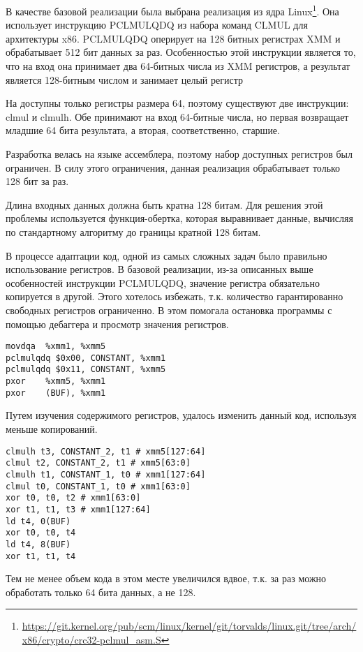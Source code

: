 
В качестве базовой реализации была выбрана реализация из ядра Linux\footnote{\url{https://git.kernel.org/pub/scm/linux/kernel/git/torvalds/linux.git/tree/arch/x86/crypto/crc32-pclmul_asm.S}}.
Она использует инструкцию PCLMULQDQ из набора команд CLMUL для архитектуры x86.
PCLMULQDQ оперирует на 128 битных регистрах XMM и обрабатывает 512 бит данных за раз.
Особенностью этой инструкции является то, что на вход она принимает два 64-битных числа из XMM регистров, а результат является 128-битным числом и занимает целый регистр

На \riscv{} доступны только регистры размера 64, поэтому существуют две инструкции: clmul и clmulh.
Обе принимают на вход 64-битные числа, но первая возвращает младшие 64 бита результата, а вторая, соответственно, старшие.

Разработка велась на языке ассемблера, поэтому набор доступных регистров был ограничен.
В силу этого ограничения, данная реализация обрабатывает только 128 бит за раз.

Длина входных данных должна быть кратна 128 битам.
Для решения этой проблемы используется функция-обертка, которая выравнивает данные, вычисляя \crctt{} по стандартному алгоритму до границы кратной 128 битам.

В процессе адаптации код, одной из самых сложных задач было правильно использование регистров.
В базовой реализации, из-за описанных выше особенностей инструкции PCLMULQDQ, значение регистра обязательно копируется в другой.
Этого хотелось избежать, т.к. количество гарантированно свободных регистров ограниченно.
В этом помогала остановка программы с помощью дебаггера и просмотр значения регистров.
\begin{lstlisting}[caption=Оригинальный код,
    label=lst:intel_clmul_orig,
    frame=single,
    mathescape=false]
movdqa  %xmm1, %xmm5
pclmulqdq $0x00, CONSTANT, %xmm1
pclmulqdq $0x11, CONSTANT, %xmm5
pxor    %xmm5, %xmm1
pxor    (BUF), %xmm1
\end{lstlisting}
Путем изучения содержимого регистров, удалось изменить данный код, используя меньше копирований.
\begin{lstlisting}[caption=Адаптированный код,
    label=lst:riscv_clmul_opt,
    frame=single,
    mathescape=false]
clmulh t3, CONSTANT_2, t1 # xmm5[127:64]
clmul t2, CONSTANT_2, t1 # xmm5[63:0]
clmulh t1, CONSTANT_1, t0 # xmm1[127:64]
clmul t0, CONSTANT_1, t0 # xmm1[63:0] 
xor t0, t0, t2 # xmm1[63:0] 
xor t1, t1, t3 # xmm1[127:64]
ld t4, 0(BUF)
xor t0, t0, t4
ld t4, 8(BUF)
xor t1, t1, t4
\end{lstlisting}
Тем не менее объем кода в этом месте увеличился вдвое, т.к. за раз можно обработать только 64 бита данных, а не 128.


